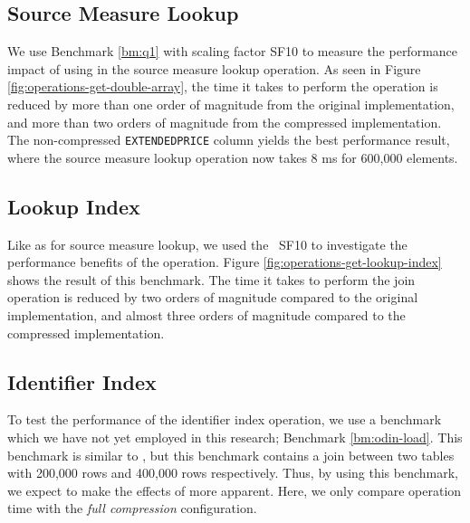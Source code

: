 \subsection{Source Measure Lookup}
\label{sub:Source Measure Lookup}

We use Benchmark \ref{bm:q1} with scaling factor SF10 to measure the performance impact of using  in the source measure lookup operation. As seen in Figure \ref{fig:operations-get-double-array}, the time it takes to perform the operation is reduced by more than one order of magnitude from the original implementation, and more than two orders of magnitude from the compressed implementation. The non-compressed \texttt{EXTENDEDPRICE} column yields the best performance result, where the source measure lookup operation now takes 8 ms for 600,000 elements.

\subsection{Lookup Index}
\label{sub:Lookup Index}


Like as for source measure lookup, we used the \tpchdl~SF10 to investigate the performance benefits of the  operation. Figure \ref{fig:operations-get-lookup-index} shows the result of this benchmark. The time it takes to perform the join operation is reduced by two orders of magnitude compared to the original implementation, and almost three orders of magnitude compared to the compressed implementation.

\subsection{Identifier Index}
\label{sub:Identifier Index}
To test the performance of the identifier index operation, we use a benchmark which we have not yet employed in this research; Benchmark \ref{bm:odin-load}. This benchmark is similar to \tpchdl, but this benchmark contains a join between two tables with 200,000 rows and 400,000 rows respectively. Thus, by using this benchmark, we expect to make the effects of  more apparent. Here, we only compare operation time with the \textit{full compression} configuration.

